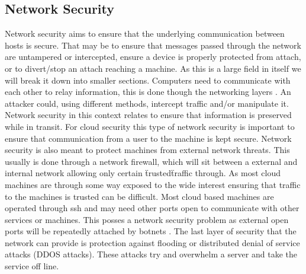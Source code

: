 \documentclass[12pt]{article}
\begin{document}
\subsection{Network Security}
Network security aims to ensure that the underlying communication between hosts is secure. That may be to ensure that messages passed through the network are untampered or intercepted, ensure a device is properly protected from attach, or to divert/stop an attach reaching a machine. As this is a large field in itself we will break it down into smaller sections. Computers need to communicate with each other to relay information, this is done though the networking layers \cite{wiki:osiModel}. An attacker could, using different methods, intercept traffic and/or manipulate it. Network security in this context relates to ensure that information is preserved while in transit. For cloud security this type of network security is important to ensure that communication from a user to the machine is kept secure. Network security is also meant to protect machines from external network threats. This usually is done through a network firewall, which will sit between a external and internal network allowing only certain \"trusted\" traffic through. As most cloud machines are through some way exposed to the wide interest ensuring that traffic to the machines is trusted can be difficult. Most cloud based machines are operated through ssh and may need other ports open to communicate with other services or machines. This posses a network security problem as external open ports will be repeatedly attached by botnets \cite{wiki:botnets}. The last layer of security that the network can provide is protection against flooding or distributed denial of service attacks (DDOS attacks). These attacks try and overwhelm a server and take the service off line.
\end{document}
